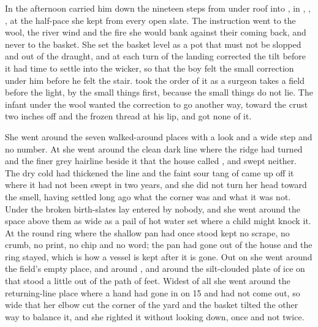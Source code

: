 In the afternoon  carried him down the nineteen steps from under  roof into , in , , , at the half-pace she kept from every open slate. The instruction went to the wool, the river wind and the fire she would bank against their coming back, and never to the basket. She set the basket level as a pot that must not be slopped and out of the draught, and at each turn of the landing corrected the tilt before it had time to settle into the wicker, so that the boy felt the small correction under him before he felt the stair.  took the order of it as a surgeon takes a field before the light, by the small things first, because the small things do not lie. The infant under the wool wanted the correction to go another way, toward the crust two inches off and the frozen thread at his lip, and got none of it.

She went around the seven walked-around places with a look and a wide step and no number. At  she went around the clean dark line where the ridge had turned and the finer grey hairline beside it that the house called , and swept neither. The dry cold had thickened the line and the faint sour tang of  came up off it where it had not been swept in two years, and she did not turn her head toward the smell, having settled long ago what the corner was and what it was not. Under  the broken birth-slates lay entered by nobody, and she went around the space above them as wide as a pail of hot water set where a child might knock it. At  the round ring where the shallow pan had once stood kept no scrape, no crumb, no print, no chip and no word; the pan had gone out of the house and the ring stayed, which is how a vessel is kept after it is gone. Out on  she went around the field's empty place, and around , and around the silt-clouded plate of ice on  that stood a little out of the path of feet. Widest of all she went around the returning-line place where a hand had gone in on  15 and had not come out, so wide that her elbow cut the corner of the yard and the basket tilted the other way to balance it, and she righted it without looking down, once and not twice.

